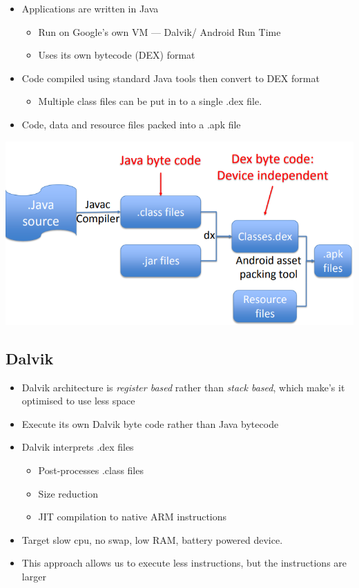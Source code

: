 \documentclass{article}
\begin{document}
\begin{multicols}{2}
  \begin{itemize}
    \item Applications are written in Java
    \begin{itemize}
      \item Run on Google’s own VM — Dalvik/ Android Run Time
      \item Uses its own bytecode (DEX) format
    \end{itemize}
    \item Code compiled using standard Java tools then convert to DEX format
    \begin{itemize}
      \item Multiple class files can be put in to a single .dex file.
    \end{itemize}
    \item Code, data and resource files packed into a .apk file
  \end{itemize}

  \vfill\null

  \includegraphics[scale=0.3]{compilation.png}
\end{multicols}

\subsection{Dalvik}

\begin{itemize}
  \item Dalvik architecture is \textit{register based} rather than \textit{stack based}, which make's it optimised to use less space
  \item Execute its own Dalvik byte code rather than Java bytecode
  \item Dalvik interprets .dex files
  \begin{itemize}
    \item Post-processes .class files
    \item Size reduction
    \item JIT compilation to native ARM instructions
  \end{itemize}
  \item Target slow cpu, no swap, low RAM, battery powered device.
  \item This approach allows us to execute less instructions, but the instructions are larger
\end{itemize}
\end{document}
